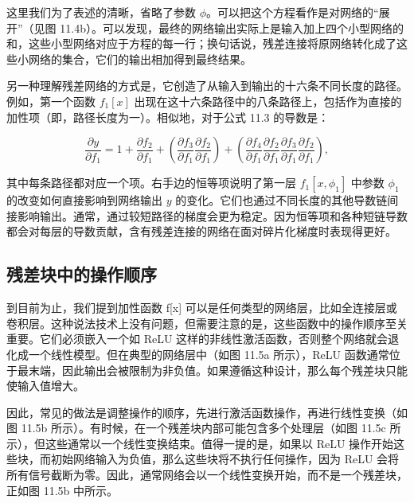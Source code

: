 \documentclass[lang=cn,newtx,10pt,scheme=chinese]{elegantbook}
\begin{document}
这里我们为了表述的清晰，省略了参数 \(\phi\)。可以把这个方程看作是对网络的“展开”（见图 11.4b）。可以发现，最终的网络输出实际上是输入加上四个小型网络的和，这些小型网络对应于方程的每一行；换句话说，残差连接将原网络转化成了这些小网络的集合，它们的输出相加得到最终结果。

另一种理解残差网络的方式是，它创造了从输入到输出的十六条不同长度的路径。例如，第一个函数 \(f_1[x]\) 出现在这十六条路径中的八条路径上，包括作为直接的加性项（即，路径长度为一）。相似地，对于公式 11.3 的导数是：

\begin{equation}
\frac{\partial y}{\partial f_1} = 1 + \frac{\partial f_2}{\partial f_1} + \left( \frac{\partial f_3}{\partial f_1} \frac{\partial f_2}{\partial f_1} \right) + \left( \frac{\partial f_4}{\partial f_1} \frac{\partial f_2}{\partial f_1} \frac{\partial f_3}{\partial f_1} \frac{\partial f_2}{\partial f_1} \right), 
\end{equation}

其中每条路径都对应一个项。右手边的恒等项说明了第一层 \(f_1[x, \phi_1]\) 中参数 \(\phi_1\) 的改变如何直接影响到网络输出 \(y\) 的变化。它们也通过不同长度的其他导数链间接影响输出。通常，通过较短路径的梯度会更为稳定。因为恒等项和各种短链导数都会对每层的导数贡献，含有残差连接的网络在面对碎片化梯度时表现得更好。

\subsection{残差块中的操作顺序}
到目前为止，我们提到加性函数 f[x] 可以是任何类型的网络层，比如全连接层或卷积层。这种说法技术上没有问题，但需要注意的是，这些函数中的操作顺序至关重要。它们必须嵌入一个如 ReLU 这样的非线性激活函数，否则整个网络就会退化成一个线性模型。但在典型的网络层中（如图 11.5a 所示），ReLU 函数通常位于最末端，因此输出会被限制为非负值。如果遵循这种设计，那么每个残差块只能使输入值增大。

因此，常见的做法是调整操作的顺序，先进行激活函数操作，再进行线性变换（如图 11.5b 所示）。有时候，在一个残差块内部可能包含多个处理层（如图 11.5c 所示），但这些通常以一个线性变换结束。值得一提的是，如果以 ReLU 操作开始这些块，而初始网络输入为负值，那么这些块将不执行任何操作，因为 ReLU 会将所有信号截断为零。因此，通常网络会以一个线性变换开始，而不是一个残差块，正如图 11.5b 中所示。
\end{document}
